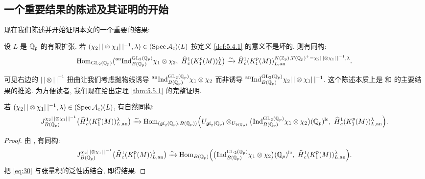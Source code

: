 
\subsection{一个重要结果的陈述及其证明的开始}\label{sec:5.5}

现在我们陈述并开始证明本文的一个重要的结果:

\begin{theorem}\label{thm:5.5.1}
设 $L$ 是 $\mathbb{Q}_p$ 的有限扩张.
若 $(\chi_2|\,| \otimes \chi_1|\,|^{-1},\lambda) \in (\operatorname{Spec} \mathcal{A}_c)(L)$ 按定义 \ref{def:5.4.1} 的意义不是坏的, 则有同构:
\[
\Hom_{\GL_2(\Qp)}\bigl(\anind_{B(\Qp)}^{\GL_2(\Qp)} \chi_1 \otimes \chi_2,\ \widehat{H}{}_{c}^{1}(K_1^{p}(M))_{L}^{\lambda}\bigr)
\xrightarrow{\sim} \widehat{H}{}_{c}^{1}(K_1^{p}(M))_{L,\mathrm{an}}^{N(\Zp),T(\Qp)^{+} = \chi_2|\,| \otimes \chi_1|\,|^{-1},\lambda}.
\]
\end{theorem}

可见右边的 $|\,| \otimes |\,|^{-1}$ 扭曲让我们考虑抛物线诱导 $\prescript{\mathrm{an}}{}{\mathrm{Ind}}_{B(\mathbb{Q}_p)}^{\mathrm{GL}_2(\mathbb{Q}_p)} \chi_1 \otimes \chi_2$ 而非诱导 $\prescript{\mathrm{an}}{}{\mathrm{Ind}}_{B(\mathbb{Q}_p)}^{\mathrm{GL}_2(\mathbb{Q}_p)} \chi_2|\,| \otimes \chi_1|\,|^{-1}$.
这个陈述本质上是 \cite[Lem.~4.5.13]{ref:24} 和 \cite{ref:25} 的主要结果的推论.
为方便读者, 我们现在给出定理 \ref{thm:5.5.1} 的完整证明.

\begin{proposition}\label{prop:5.5.2}
若 $(\chi_2|\,| \otimes \chi_1|\,|^{-1},\lambda) \in (\operatorname{Spec} \mathcal{A}_c)(L)$, 有自然同构:
\begin{equation}
\label{eq:29}
J_{B(\Qp)}^{\chi_2|\,| \otimes \chi_1|\,|^{-1}}\bigl(\widehat{H}{}_{c}^{1}(K_1^{p}(M))_{L,\mathrm{an}}^{\lambda}\bigr)
\xrightarrow{\sim} \Hom_{(\mathfrak{gl}_2(\Qp),B(\Qp))}\Bigl(U_{\mathfrak{gl}_2(\Qp)} \otimes_{U_{\mathfrak{b}(\Qp)}} \bigl(\pind{}_{B(\Qp)}^{\GL_2(\Qp)} \chi_1 \otimes \chi_2\bigr)(\Qp)^{\mathrm{lc}},\ \widehat{H}{}_{c}^{1}(K_1^{p}(M))_{L,\mathrm{an}}^{\lambda}\Bigr).
\end{equation}
\end{proposition}

\begin{proof}
由 \cite[Th.~3.5.6]{ref:22}, 有同构:
\begin{equation}
\label{eq:30}
J_{B(\Qp)}^{\chi_2|\,| \otimes \chi_1|\,|^{-1}}\bigl(\widehat{H}{}_{c}^{1}(K_1^{p}(M))_{L,\mathrm{an}}^{\lambda}\bigr)
\xrightarrow{\sim} \Hom_{B(\Qp)}\Bigl(\bigl(\pind{}_{B(\Qp)}^{\GL_2(\Qp)} \chi_1 \otimes \chi_2\bigr)(\Qp)^{\mathrm{lc}},\ \widehat{H}{}_{c}^{1}(K_1^{p}(M))_{L,\mathrm{an}}^{\lambda}\Bigr).
\end{equation}
把 \eqref{eq:30} 与张量积的泛性质结合, 即得结果.
\end{proof}

